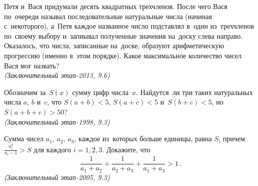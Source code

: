 \begin{problems}
\item
Петя и~Вася придумали десять квадратных трехчленов.
После чего Вася по~очереди называл последовательные натуральные числа
(начиная с~некоторого), а~Петя каждое названное число подставлял в~один
из~трехчленов по~своему выбору и~запиывал полученные значения на~доску слева
направо.
Оказалось, что числа, записанные на~доске, образуют арифметическую прогрессию
(именно в~этом порядке).
Какое максимальное количество чисел Вася мог назвать?
\\\emph{(Заключительный этап-2013, 9.6)}

\item
Обозначим за~$S(x)$ сумму цифр числа~$x$.
Найдутся~ли три таких натуральных числа $a$, $b$ и~$c$, что
$S(a + b) < 5$, $S(a + c) < 5$ и~$S(b + c) < 5$, но~$S(a + b + c) > 50$?
\\\emph{(Заключительный этап-1998, 9.3)}

\item
Сумма чисел $a_1$, $a_2$, $a_3$, каждое из~которых больше единицы, равна $S$,
причем $\frac{a_i^2}{a_i - 1} > S$ для каждого $i = 1, 2, 3$.
Докажите, что
\[
    \frac{1}{a_1 + a_2} + \frac{1}{a_2 + a_3} + \frac{1}{a_1 + a_3}
>
    1
\,.\]
\emph{(Заключительный этап-2005, 9.3)}

\end{problems}

